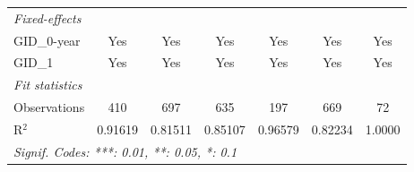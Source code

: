 \begin{table}[H]
\begin{tabular}{lcccccc}
      \midrule
      \emph{Fixed-effects}\\
      GID\_0-year                                          & Yes           & Yes           & Yes      & Yes          & Yes      & Yes\\  
      GID\_1                                               & Yes           & Yes           & Yes      & Yes          & Yes      & Yes\\  
      \midrule
      \emph{Fit statistics}\\
      Observations                                         & 410           & 697           & 635      & 197          & 669      & 72\\  
      R$^2$                                                & 0.91619       & 0.81511       & 0.85107  & 0.96579      & 0.82234  & 1.0000\\  
      \midrule \midrule
      \multicolumn{7}{l}{\emph{Signif. Codes: ***: 0.01, **: 0.05, *: 0.1}}\\
   \end{tabular}
\end{table}


